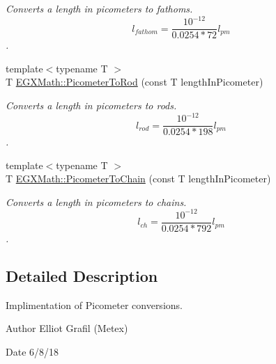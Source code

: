 \begin{DoxyCompactItemize}
\begin{DoxyCompactList}\small\item\em Converts a length in picometers to fathoms. \[ l_{fathom}= \frac{10^{-12}}{0.0254 * 72} l_{pm} \]. \end{DoxyCompactList}\item 
{\footnotesize template$<$typename T $>$ }\\T \mbox{\hyperlink{group___e_g_x_math-_conversions-_length_conversions-_s_i-_picometer-_surveyors_gad6009949eef7a49d34a7fa859ecdf0c6}{E\+G\+X\+Math\+::\+Picometer\+To\+Rod}} (const T length\+In\+Picometer)
\begin{DoxyCompactList}\small\item\em Converts a length in picometers to rods. \[ l_{rod}= \frac{10^{-12}}{0.0254 * 198} l_{pm} \]. \end{DoxyCompactList}\item 
{\footnotesize template$<$typename T $>$ }\\T \mbox{\hyperlink{group___e_g_x_math-_conversions-_length_conversions-_s_i-_picometer-_surveyors_gae6629983b2f6ff484d0fc5c773193763}{E\+G\+X\+Math\+::\+Picometer\+To\+Chain}} (const T length\+In\+Picometer)
\begin{DoxyCompactList}\small\item\em Converts a length in picometers to chains. \[ l_{ch}= \frac{10^{-12}}{0.0254 * 792} l_{pm} \]. \end{DoxyCompactList}\end{DoxyCompactItemize}


\subsection{Detailed Description}
Implimentation of Picometer conversions. 

\begin{DoxyAuthor}{Author}
Elliot Grafil (Metex) 
\end{DoxyAuthor}
\begin{DoxyDate}{Date}
6/8/18 
\end{DoxyDate}
